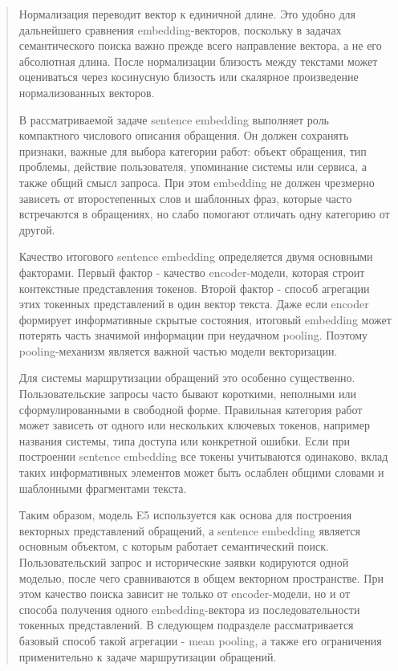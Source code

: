 \begin{quote}
Нормализация переводит вектор к единичной длине. Это удобно для
дальнейшего сравнения embedding-векторов, поскольку в задачах
семантического поиска важно прежде всего направление вектора, а не его
абсолютная длина. После нормализации близость между текстами может
оцениваться через косинусную близость или скалярное произведение
нормализованных векторов.

В рассматриваемой задаче sentence embedding выполняет роль компактного
числового описания обращения. Он должен сохранять признаки, важные для
выбора категории работ: объект обращения, тип проблемы, действие
пользователя, упоминание системы или сервиса, а также общий смысл
запроса. При этом embedding не должен чрезмерно зависеть от
второстепенных слов и шаблонных фраз, которые часто встречаются в
обращениях, но слабо помогают отличать одну категорию от другой.

Качество итогового sentence embedding определяется двумя основными
факторами. Первый фактор - качество encoder-модели, которая строит
контекстные представления токенов. Второй фактор - способ агрегации этих
токенных представлений в один вектор текста. Даже если encoder формирует
информативные скрытые состояния, итоговый embedding может потерять часть
значимой информации при неудачном pooling. Поэтому pooling-механизм
является важной частью модели векторизации.

Для системы маршрутизации обращений это особенно существенно.
Пользовательские запросы часто бывают короткими, неполными или
сформулированными в свободной форме. Правильная категория работ может
зависеть от одного или нескольких ключевых токенов, например названия
системы, типа доступа или конкретной ошибки. Если при построении
sentence embedding все токены учитываются одинаково, вклад таких
информативных элементов может быть ослаблен общими словами и шаблонными
фрагментами текста.

Таким образом, модель E5 используется как основа для построения
векторных представлений обращений, а sentence embedding является
основным объектом, с которым работает семантический поиск.
Пользовательский запрос и исторические заявки кодируются одной моделью,
после чего сравниваются в общем векторном пространстве. При этом
качество поиска зависит не только от encoder-модели, но и от способа
получения одного embedding-вектора из последовательности токенных
представлений. В следующем подразделе рассматривается базовый способ
такой агрегации - mean pooling, а также его ограничения применительно к
задаче маршрутизации обращений.
\end{quote}

